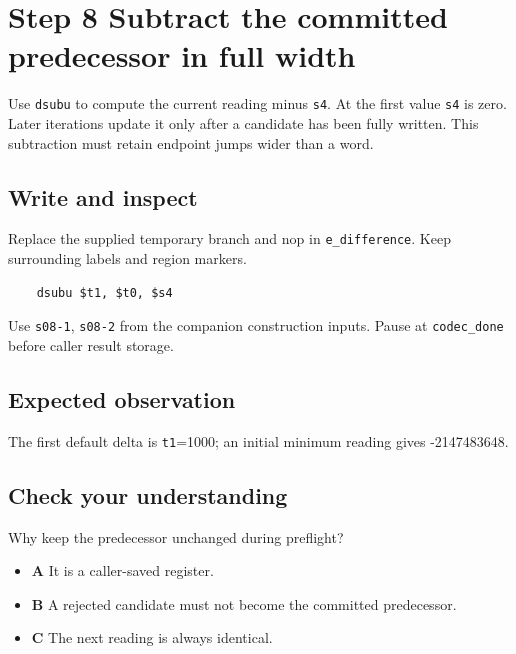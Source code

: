 \section{Step 8 Subtract the committed predecessor in full width}\label{delta-s08}

Use \texttt{dsubu} to compute the current reading minus \texttt{s4}. At the first value \texttt{s4} is zero. Later iterations update it only after a candidate has been fully written. This subtraction must retain endpoint jumps wider than a word.

\subsection{Write and inspect}
Replace the supplied temporary branch and nop in \texttt{e\_difference}. Keep surrounding labels and region markers.

\begin{verbatim}
    dsubu $t1, $t0, $s4
\end{verbatim}
Use \texttt{s08-1}, \texttt{s08-2} from the companion construction inputs. Pause at \texttt{codec\_done} before caller result storage.

\subsection{Expected observation}
The first default delta is \texttt{t1}=1000; an initial minimum reading gives -2147483648.

\subsection{Check your understanding}
Why keep the predecessor unchanged during preflight?

\begin{itemize}
  \item \textbf{A} It is a caller-saved register.
  \item \textbf{B} A rejected candidate must not become the committed predecessor.
  \item \textbf{C} The next reading is always identical.
\end{itemize}
